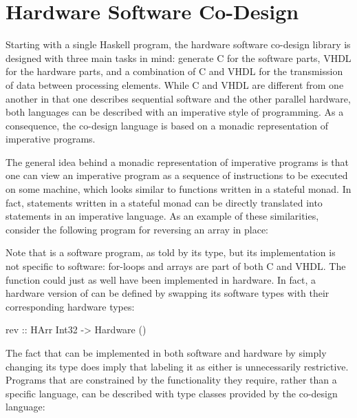 \documentclass[../paper.tex]{subfiles}
\begin{document}
\chapter{Hardware Software Co-Design}
\label{codesign}

Starting with a single Haskell program, the hardware software co-design library is designed with three main tasks in mind: generate C for the software parts, VHDL for the hardware parts, and a combination of C and VHDL for the transmission of data between processing elements. While C and VHDL are different from one another in that one describes sequential software and the other parallel hardware, both languages can be described with an imperative style of programming. As a consequence, the co-design language is based on a monadic representation of imperative programs.

The general idea behind a monadic representation of imperative programs is that one can view an imperative program as a sequence of instructions to be executed on some machine, which looks similar to functions written in a stateful monad. In fact, statements written in a stateful monad can be directly translated into statements in an imperative language. As an example of these similarities, consider the following program for reversing an array in place:


Note that  is a software program, as told by its type, but its implementation is not specific to software: for-loops and arrays are part of both C and VHDL. The function could just as well have been implemented in hardware. In fact, a hardware version of  can be defined by swapping its software types with their corresponding hardware types:

\begin{code}
rev :: HArr Int32 -> Hardware ()
\end{code}

The fact that  can be implemented in both software and hardware by simply changing its type does imply that labeling it as either is unnecessarily restrictive. Programs that are constrained by the functionality they require, rather than a specific language, can be described with type classes provided by the co-design language:
\end{document}
